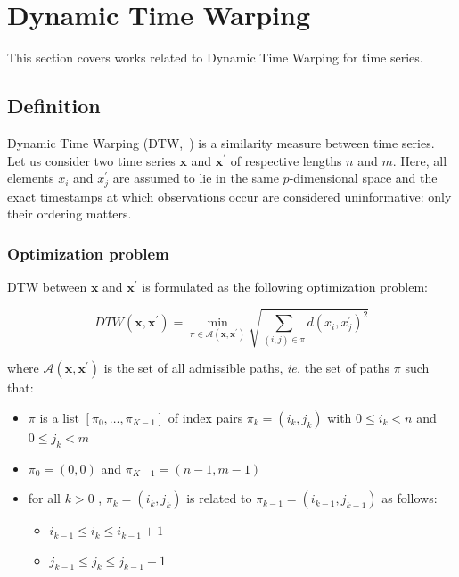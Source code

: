 \section{Dynamic Time Warping}
\label{sec:dtw}

This section covers works related to Dynamic Time Warping for time series.

\subsection{Definition}


Dynamic Time Warping (DTW,~\cite{sakoe1978dynamic}) is a similarity measure
between time series.
Let us consider two time series $\mathbf{x}$ and
$\mathbf{x}^\prime$ of respective lengths $n$ and
$m$.
Here, all elements $x_i$ and $x^\prime_j$ are assumed to lie in the same
$p$-dimensional space and the exact timestamps at which observations occur are
considered uninformative: only their ordering matters.

\subsubsection{Optimization problem}

DTW between $\mathbf{x}$ and $\mathbf{x}^\prime$ is formulated as the following
optimization problem:

\begin{equation}
DTW(\mathbf{x}, \mathbf{x}^\prime) =
    \min_{\pi \in \mathcal{A}(\mathbf{x}, \mathbf{x}^\prime)}
        \sqrt{ \sum_{(i, j) \in \pi} d(x_i, x^\prime_j)^2 }
\label{eq:dtw}
\end{equation}

where $\mathcal{A}(\mathbf{x}, \mathbf{x}^\prime)$ is the set of all admissible
paths, \emph{ie.} the set of paths $\pi$ such that:

\begin{itemize}
\item $\pi$ is a list $[\pi_0, \dots , \pi_{K-1}]$ of index pairs
  $\pi_k = (i_k, j_k)$ with $0 \leq i_k < n$ and $0 \leq j_k < m$
\item $\pi_0 = (0, 0)$ and $\pi_{K-1} = (n - 1, m - 1)$
\item for all $k > 0$ , $\pi_k = (i_k, j_k)$ is related to
  $\pi_{k-1} = (i_{k-1}, j_{k-1})$ as follows:
  \begin{itemize}
  \item $i_{k-1} \leq i_k \leq i_{k-1} + 1$
  \item $j_{k-1} \leq j_k \leq j_{k-1} + 1$
\end{itemize}
\end{itemize}

